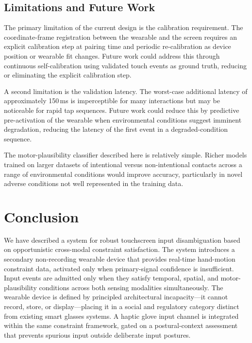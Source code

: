 \documentclass[11pt,letterpaper]{article}
\begin{document}
\subsection{Limitations and Future Work}

The primary limitation of the current design is the calibration requirement. The
coordinate-frame registration between the wearable and the screen requires an
explicit calibration step at pairing time and periodic re-calibration as device
position or wearable fit changes. Future work could address this through continuous
self-calibration using validated touch events as ground truth, reducing or
eliminating the explicit calibration step.

A second limitation is the validation latency. The worst-case additional latency
of approximately 150\,ms is imperceptible for many interactions but may be
noticeable for rapid tap sequences. Future work could reduce this by predictive
pre-activation of the wearable when environmental conditions suggest imminent
degradation, reducing the latency of the first event in a degraded-condition
sequence.

The motor-plausibility classifier described here is relatively simple. Richer
models trained on larger datasets of intentional versus non-intentional contacts
across a range of environmental conditions would improve accuracy, particularly
in novel adverse conditions not well represented in the training data.

\section{Conclusion}
\label{sec:conclusion}

We have described a system for robust touchscreen input disambiguation based on
opportunistic cross-modal constraint satisfaction. The system introduces a secondary
non-recording wearable device that provides real-time hand-motion constraint data,
activated only when primary-signal confidence is insufficient. Input events are
admitted only when they satisfy temporal, spatial, and motor-plausibility conditions
across both sensing modalities simultaneously. The wearable device is defined by
principled architectural incapacity---it cannot record, store, or display---placing
it in a social and regulatory category distinct from existing smart glasses systems.
A haptic glove input channel is integrated within the same constraint framework,
gated on a postural-context assessment that prevents spurious input outside
deliberate input postures.
\end{document}
